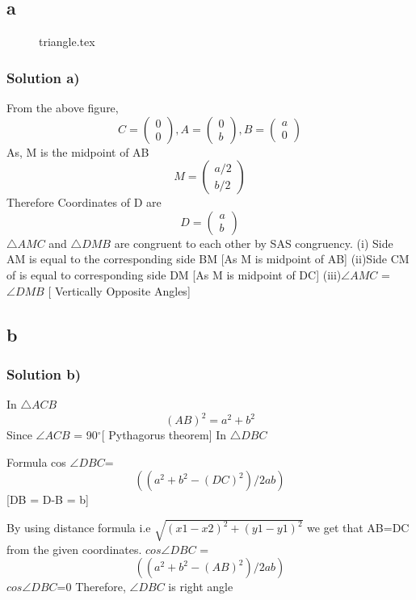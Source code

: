 \documentclass{beamer}
\begin{document}
\subsection{a}
\begin{frame}
\begin{figure}[ht]

{triangle.tex}

\label{fig:triangle}
\end{figure}
\end{frame}
\begin{frame}
\frametitle{Solution a)}
\label{a}
\small
From the above figure,
$$
C=
\begin{pmatrix}
0\\
0
\end{pmatrix}
,A=
\begin{pmatrix}
0\\
b
\end{pmatrix}
,B=
\begin{pmatrix}
a\\
0
\end{pmatrix}
$$
As, M is the midpoint of AB
$$
M=
\begin{pmatrix}
a/2 \\
b/2 
\end{pmatrix}
$$
Therefore Coordinates of D are
$$
D=
\begin{pmatrix}
a\\
b
\end{pmatrix}
$$
\newline
$\triangle AMC$ and $\triangle DMB$ are congruent to each other by SAS congruency.
\newline
(i) Side AM  is equal to the corresponding side BM  [As M is midpoint of AB]
\newline
(ii)Side CM of is equal to corresponding side DM [As M is midpoint of DC]
\newline
(iii)$\angle AMC$ = $\angle DMB$ [ Vertically Opposite Angles]
\end{frame}
\subsection{b}
\begin{frame}
\frametitle{Solution b)}
\label{b}
\small
In $\triangle ACB$ \[(AB)^2=a^2+b^2\]
Since $\angle ACB$ = 90$^{\circ}$[ Pythagorus theorem]
\newline
In $\triangle DBC$ 
\begin{block}{Formula}
cos $\angle DBC$= \[((a^2+b^2-(DC)^2)/2ab)\] [DB = D-B = b]
\end{block}
By using distance formula i.e $\sqrt{(x1-x2)^2+(y1-y1)^2}$ we get that AB=DC from the given coordinates.
\newline
$cos\angle DBC$ =\[((a^2+b^2-(AB)^2)/2ab)\]
$cos\angle DBC$=0
\newline
Therefore, $\angle DBC$ is right angle
\end{frame}
\end{document}
